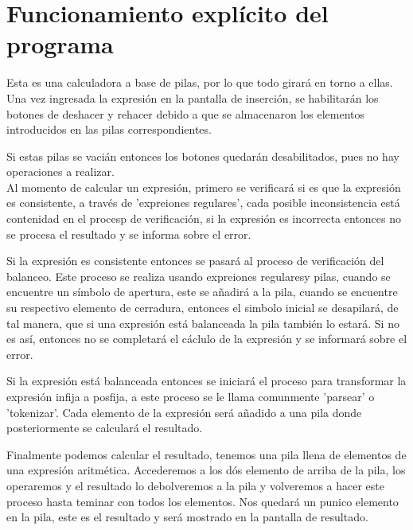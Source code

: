 \documentclass[a4paper,12pt]{article}
\begin{document}
\section{Funcionamiento explícito del programa}
Esta es una calculadora a base de pilas, por lo que todo girará en torno a ellas.
Una vez ingresada la expresión en la pantalla de inserción, se habilitarán los botones de deshacer y rehacer debido a que se almacenaron los elementos introducidos en las pilas correspondientes.

Si estas pilas se vacián entonces los botones quedarán desabilitados, pues no hay operaciones a realizar.\\

Al momento de calcular un expresión, primero se verificará si es que la expresión es consistente, a través de 'expreiones regulares', cada posible inconsistencia está contenidad en el procesp de verificación, si la expresión es incorrecta entonces no se procesa el resultado y se informa sobre el error. 

Si la expresión es consistente entonces se pasará al proceso de verificación del balanceo. Este proceso se realiza usando expreiones regularesy pilas, cuando se encuentre un símbolo de apertura, este se añadirá a la pila, cuando se encuentre su respectivo elemento de cerradura, entonces el simbolo inicial se desapilará, de tal manera, que si una expresión está balanceada la pila también lo estará. Si no es así, entonces no se completará el cáclulo de la expresión y se informará sobre el error.

Si la expresión está balanceada entonces se iniciará el proceso para transformar la expresión infija a posfija, a este proceso se le llama comunmente 'parsear' o 'tokenizar'. Cada elemento de la expresión será añadido a una pila donde posteriormente se calculará el resultado.

Finalmente podemos calcular el resultado, tenemos una pila llena de elementos de una expresión aritmética. Accederemos a los dós elemento de arriba de la pila, los operaremos y el resultado lo debolveremos a la pila y volveremos a hacer este proceso hasta teminar con todos los elementos. Nos quedará un punico elemento en la pila, este es el resultado y será mostrado en la pantalla de resultado. 
\end{document}

